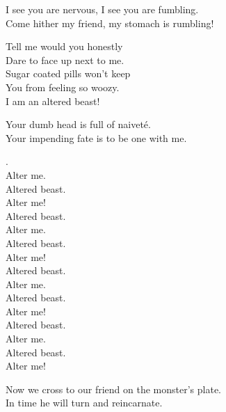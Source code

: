 
I see you are nervous, I see you are fumbling. \\
Come hither my friend, my stomach is rumbling! \\


Tell me would you honestly \\
Dare to face up next to me. \\
Sugar coated pills won't keep \\
You from feeling so woozy. \\

I am an altered beast! \\





Your dumb  head is full of naiveté. \\
Your impending fate is to be one with me. \\


 . \\
Alter me. \\
Altered beast. \\
Alter me! \\

Altered beast. \\
Alter me. \\
Altered beast. \\
Alter me! \\

Altered beast. \\
Alter me. \\
Altered beast. \\
Alter me! \\

Altered beast. \\
Alter me. \\
Altered beast. \\
Alter me! \\


Now we cross to our friend on the monster's plate. \\
In time he will turn and reincarnate. \\

